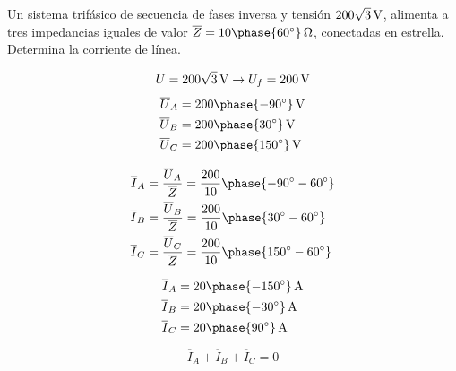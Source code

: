 \documentclass[12pt]{article}
\begin{document}
\title{}

\date{2019-20}

\section{}

Un sistema trifásico de secuencia de fases inversa y tensión
$\SI[parse-numbers=false]{200\sqrt{3}}{\volt}$, alimenta a tres
impedancias iguales de valor
$\overline{Z} = \SI[parse-numbers=false]{10\phase{\ang{60}}}{\ohm}$,
conectadas en estrella. Determina la corriente de línea.

\noindent\hrulefill

\[ U = \SI[parse-numbers=false]{200\sqrt{3}}{\volt} \rightarrow U_f =
  \SI{200}{\volt}
\]
\begin{align*} \overline{U}_A &=
                                \SI[parse-numbers=false]{200\phase{\ang{-90}}}{\volt}\\
  \overline{U}_B
                              &= \SI[parse-numbers=false]{200\phase{\ang{30}}}{\volt}\\
  \overline{U}_C &=
                   \SI[parse-numbers=false]{200\phase{\ang{150}}}{\volt}\\
\end{align*}

\begin{align*} \overline{I}_A &= \frac{\overline{U}_A}{\overline{Z}} =
  \frac{200}{10}\phase{\ang{-90} - \ang{60}} \\ \overline{I}_B &=
  \frac{\overline{U}_B}{\overline{Z}} = \frac{200}{10}\phase{\ang{30}
    - \ang{60}}\\ \overline{I}_C &=
  \frac{\overline{U}_C}{\overline{Z}} = \frac{200}{10}\phase{\ang{150}
    - \ang{60}}
\end{align*}

\begin{align*} \overline{I}_A &=
                                \SI[parse-numbers=false]{20\phase{\ang{-150}}}{\ampere}\\
  \overline{I}_B &=
                   \SI[parse-numbers=false]{20\phase{\ang{-30}}}{\ampere}\\
  \overline{I}_C &=
                   \SI[parse-numbers=false]{20\phase{\ang{90}}}{\ampere}
\end{align*}

\[ \overline{I}_A + \overline{I}_B + \overline{I}_C = 0
\]

\clearpage
 
\section{}
\end{document}
